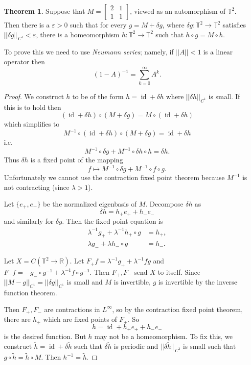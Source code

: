 \documentclass[12pt]{report}
\newcommand{\RR}{\mathbb{R}}
\newcommand{\TT}{\mathbb{T}}
\newcommand{\id}{\operatorname{id}}
\newcommand{\dfn}[1]{\emph{#1}\index{#1}}
\theoremstyle{definition}
\newtheorem{theorem}{Theorem}[chapter]
\begin{document}
\begin{theorem}
Suppose that $M = \begin{bmatrix}2 & 1\\1 &1 \end{bmatrix}$, viewed as an automorphism of $\TT^2$. Then there is a $\varepsilon > 0$ such that for every $g = M + \delta g$, where $\delta g: \TT^2 \to \TT^2$ satisfies $||\delta g||_{C^1} < \varepsilon$, there is a homeomorphism $h: \TT^2 \to \TT^2$ such that $h \circ g = M \circ h$.
\end{theorem}
To prove this we need to use \dfn{Neumann series}; namely, if $||A|| < 1$ is a linear operator then
$$(1 - A)^{-1} = \sum_{k=0}^\infty A^k.$$
\begin{proof}
We construct $h$ to be of the form $h = \id + \delta h$ where $||\delta h||_{C^1}$ is small. If this is to hold then
$$(\id + \delta h) \circ (M + \delta g) = M \circ (\id + \delta h)$$
which simplifies to
$$M^{-1} \circ (\id + \delta h) \circ (M + \delta g) = \id + \delta h$$
i.e.
$$M^{-1} \circ \delta g + M^{-1} \circ \delta h \circ h = \delta h.$$
Thus $\delta h$ is a fixed point of the mapping
$$f \mapsto M^{-1} \circ \delta g + M^{-1} \circ f \circ g.$$
Unfortunately we cannot use the contraction fixed point theorem because $M^{-1}$ is not contracting (since $\lambda > 1$).

Let $\{e_+, e_-\}$ be the normalized eigenbasis of $M$. Decompose $\delta h$ as
$$\delta h = h_+ e_+ + h_- e_-$$
and similarly for $\delta g$. Then the fixed-point equation is
\begin{align*}
\lambda^{-1}g_+ + \lambda^{-1}h_+ \circ g &= h_+,\\
\lambda g_- + \lambda h_- \circ g &= h_-.\end{align*}

Let $X = C(\TT^2 \to \RR)$. Let $F_+f = \lambda^{-1} g_+ + \lambda^{-1}f g$ and $F_-f = -g_- \circ g^{-1} + \lambda^{-1} f \circ g^{-1}$. Then $F_+,F_-$ send $X$ to itself. Since $||M - g||_{C^1} = ||\delta g||_{C^1}$ is small and $M$ is invertible, $g$ is invertible by the inverse function theorem.

Then $F_+, F_-$ are contractions in $L^\infty$, so by the contraction fixed point theorem, there are $h_\pm$ which are fixed points of $F_\pm$. So
$$h = \id + h_+e_+ + h_-e_-$$
is the desired function. But $h$ may not be a homeomorphism. To fix this, we construct $\tilde h = \id + \delta \tilde h$ such that $\delta \tilde h$ is periodic and $||\delta \tilde h||_{C^1}$ is small such that $g \circ \tilde h = \tilde h \circ M$. Then $h^{-1} = \tilde h$.


\end{proof}
\end{document}
